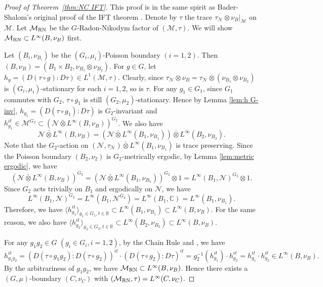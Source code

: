 \documentclass[12pt]{amsart}
\newcommand{\C}{{\mathbb C}}
\newcommand{\R}{{\mathbb R}}
\newcommand{\cM}{{\mathcal M}}
\newcommand{\cN}{{\mathcal N}}
\newcommand{\RN}{{\rm RN}}
\theoremstyle{definition}
\begin{document}
\begin{proof}[Proof of Theorem~\ref{thm:NC IFT}]
This proof is in the same spirit as Bader-Shalom's original proof of the IFT theorem \cite[Theorem 1.9]{BS06}. Denote by $\tau$ the trace $\tau_\cN\otimes\nu_B|_\cM$ on $\cM$. Let $\cM_\RN$ be the $G$-Radon-Nikodym factor of $(\cM,\tau)$. We will show $\cM_\RN\subset L^\infty(B,\nu_B)$ first.

 Let $(B_i,\nu_{B_i})$ be the $(G_i,\mu_i)$-Poisson boundary $(i=1,2)$. Then $(B,\nu_B)=(B_1\times B_2,\nu_{B_1}\otimes\nu_{B_2})$. For $g\in G$, let $h_g=(D(\tau\circ g):D\tau)\in L^1(\cM,\tau)$. Clearly, since $\tau_\cN\otimes\nu_B=\tau_\cN\otimes(\nu_{B_1}\otimes\nu_{B_2})$ is $(G_i,\mu_i)$-stationary for each $i=1,2$, so is $\tau$. For any $g_1\in G_1$, since $G_1$ commutes with $G_2$, $\tau\circ g_1$ is still $(G_2,\mu_2)$-stationary. Hence by Lemma \ref{lem:h G-inv}, $h_{g_1}=(D(\tau\circ g_1):D\tau)$ is $G_2$-invariant and $h_{g_1}^{it}\in\cM^{G_2}\subset(\cN\bar{\otimes}L^\infty(B, \nu_B))^{G_2}$. We also have
$$\cN\bar{\otimes}L^\infty(B, \nu_B)=(\cN\bar{\otimes}L^\infty (B_1,\nu_{B_1}))\bar{\otimes} L^\infty(B_2, \nu_{B_2}).$$
Note that the $G_2$-action on $(\cN,\tau_\cN)\bar{\otimes}L^\infty (B_1,\nu_{B_1})$ is  trace preserving. Since the Poisson boundary $(B_2,\nu_2)$ is $G_2$-metrically ergodic, by Lemma \ref{lem:metric ergodic}, we have
$$(\cN\bar{\otimes}L^\infty(B, \nu_B))^{G_2}=(\cN\bar{\otimes}L^\infty (B_1,\nu_{B_1}))^{G_2}\otimes1=L^\infty(B_1,\cN)^{G_2}\otimes 1.$$
Since $G_2$ acts trivially on $B_1$ and ergodically on $\cN$, we have
$$L^\infty(B_1,\cN)^{G_2}=L^\infty(B_1,\cN^{G_2})=L^\infty(B_1,\C)=L^\infty(B_1,\nu_{B_1}).$$
Therefore, we have $\langle h_{g_1}^{it}\rangle_{g_1\in G_1,t\in\R}\subset L^\infty(B_1,\nu_{B_1})\subset L^\infty(B,\nu_B)$. For the same reason, we also have $\langle h_{g_2}^{it}\rangle_{g_2\in G_2,t\in\R}\subset L^\infty(B_2,\nu_{B_2})\subset L^\infty(B,\nu_B)$.

For any $g_1g_2\in G$ $(g_i\in G_i, i=1,2)$, by the Chain Rule \cite[Theorem VIII.3.7]{takesaki} and \cite[Formula (33) in the proof of Corollary VIII.3.6]{takesaki}, we have
$$h_{g_1g_2}^{it}=(D(\tau\circ g_1g_2):D(\tau\circ g_2))^{it}\cdot(D(\tau\circ g_2):D\tau)^{it}=g_2^{-1}(h_{g_1}^{it})\cdot h_{g_2}^{it}=h_{g_1}^{it}\cdot h_{g_2}^{it}\in L^\infty(B,\nu_B).$$
By the arbitrariness of $g_1g_2$, we have $\cM_\RN\subset L^\infty(B,\nu_B)$. Hence there exists a $(G,\mu)$-boundary $(C,\nu_C)$ with $(\cM_\RN,\tau)=L^\infty(C,\nu_C)$.


\end{proof}
\end{document}
